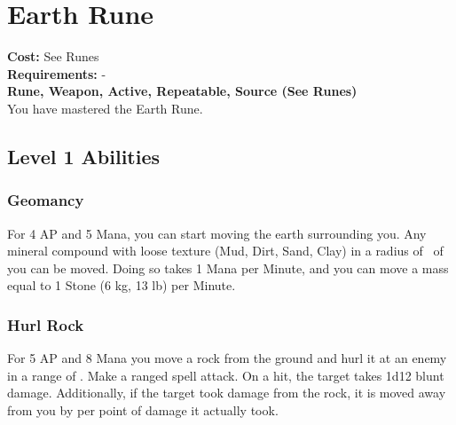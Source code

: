 \section{Earth Rune}\label{rune:earth}
\textbf{Cost:} See Runes\\
\textbf{Requirements:} -\\
\textbf{Rune, Weapon, Active, Repeatable, Source (See Runes)}\\
You have mastered the Earth Rune.

\subsection{Level 1 Abilities}

\subsubsection{Geomancy}
For 4 AP and 5 Mana, you can start moving the earth surrounding you.
Any mineral compound with loose texture (Mud, Dirt, Sand, Clay) in a radius of~ of you can be moved.
Doing so takes 1 Mana per Minute, and you can move a mass equal to 1 Stone (6 kg, 13 lb) per Minute.

\subsubsection{Hurl Rock}
For 5 AP and 8 Mana you move a rock from the ground and hurl it at an enemy in a range of .
Make a ranged spell attack.
On a hit, the target takes 1d12 blunt damage.
Additionally, if the target took damage from the rock, it is moved away from you by  per point of damage it actually took.